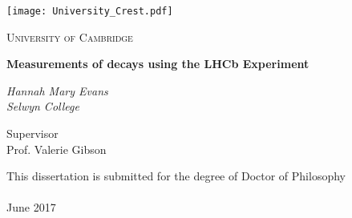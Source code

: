 \begin{titlepage}
  \centering
  \texttt{[image: University\_Crest.pdf]}\par\vspace{1cm}
  {\scshape\LARGE  University of Cambridge \par}
  \vspace{1cm}
  \vspace{1.5cm}
  {\LARGE\bfseries Measurements of  decays using the LHCb Experiment \par}
  \vspace{2cm}
  {\Large\itshape Hannah Mary Evans\\
    Selwyn College\par}
  \vfill
  {\large
  Supervisor  \\
  Prof. Valerie Gibson
  }
  \vfill

  {\large This dissertation is submitted for the degree of Doctor of Philosophy \\
\\
June 2017}
\end{titlepage}
